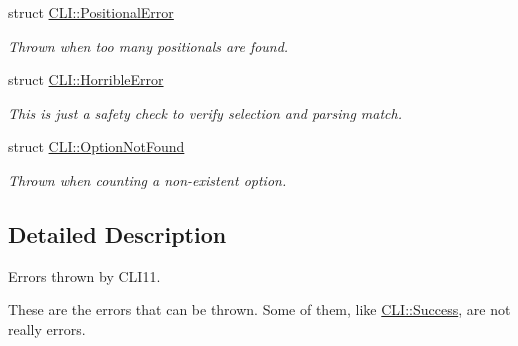 \begin{DoxyCompactItemize}
struct \hyperlink{struct_c_l_i_1_1_positional_error}{C\+L\+I\+::\+Positional\+Error}
\begin{DoxyCompactList}\small\item\em Thrown when too many positionals are found. \end{DoxyCompactList}\item 
struct \hyperlink{struct_c_l_i_1_1_horrible_error}{C\+L\+I\+::\+Horrible\+Error}
\begin{DoxyCompactList}\small\item\em This is just a safety check to verify selection and parsing match. \end{DoxyCompactList}\item 
struct \hyperlink{struct_c_l_i_1_1_option_not_found}{C\+L\+I\+::\+Option\+Not\+Found}
\begin{DoxyCompactList}\small\item\em Thrown when counting a non-\/existent option. \end{DoxyCompactList}\end{DoxyCompactItemize}


\subsection{Detailed Description}
Errors thrown by C\+L\+I11. 

These are the errors that can be thrown. Some of them, like \hyperlink{struct_c_l_i_1_1_success}{C\+L\+I\+::\+Success}, are not really errors. 